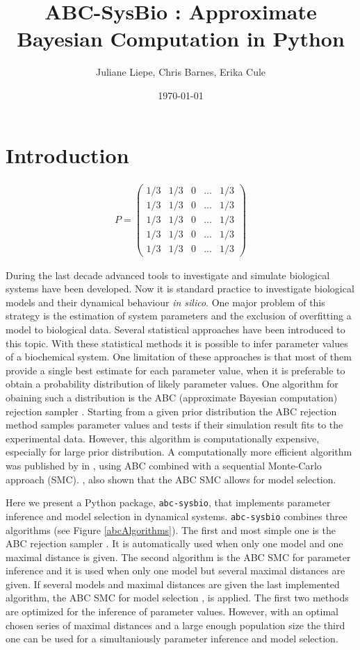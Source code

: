 \documentclass[a4paper]{report}
\title{ABC-SysBio : Approximate Bayesian Computation in Python}
\author{Juliane Liepe, Chris Barnes, Erika Cule}
\date{\today}
\begin{document}
\maketitle
\tableofcontents

\chapter{Introduction}

\begin{eqnarray*}
P=\left(
\begin{array}{ccccc}
1/3&1/3&0&...&1/3\\
1/3&1/3&0&...&1/3\\
1/3&1/3&0&...&1/3\\
1/3&1/3&0&...&1/3\\
1/3&1/3&0&...&1/3
\end{array}
\right)
\end{eqnarray*}


During the last decade  advanced tools to investigate and simulate biological systems have been developed. Now it is standard practice to investigate biological models and their dynamical behaviour {\it in silico}. One major problem of this strategy is the estimation of system parameters and the exclusion of overfitting a model to biological data. Several statistical approaches have been introduced to this topic. With these statistical methods it is possible to infer parameter values of a biochemical system. One limitation of these approaches is that most of them provide a single best estimate for each parameter value, when it is preferable to obtain a probability distribution of likely parameter values. One algorithm for obaining such a distribution is the ABC (approximate Bayesian computation) rejection sampler \citep{ABCrejection}. Starting from a given prior distribution the ABC rejection method samples parameter values and tests if their simulation result fits to the experimental data. However, this algorithm is computationally expensive, especially for large prior distribution. A computationally more efficient algorithm was published by \citeauthor{Toni2009} in  \citeyear{Toni2009}, using ABC combined with a sequential Monte-Carlo approach (SMC). \cite{Toni2009}, \cite{Toni2010} also shown that the ABC SMC allows for model selection.

Here we present a Python package, \verb$abc-sysbio$, that implements parameter inference and model selection in dynamical systems. \verb$abc-sysbio$ combines three algorithms (see Figure \ref{abcAlgorithms}). The first and most simple one is the ABC rejection sampler \cite{ABCrejection}. It is automatically used when only one model and one maximal distance is given. The second algorithm is the ABC SMC for parameter inference \cite{Toni2009} and it is used when only one model but several maximal distances are given. If several models and maximal distances are given the last implemented algorithm, the ABC SMC for model selection \cite{Toni2009}, is applied. The first two methods are optimized for the inference of parameter values. However, with an optimal chosen series of maximal distances and a large enough population size the third one can be used for a simultaniously parameter inference and model selection.
\end{document}
